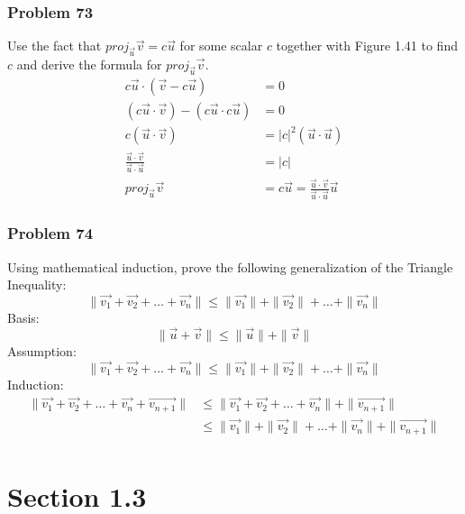 \documentclass[letterpaper, 12pt]{math}
\begin{document}
\subsubsection*{Problem 73}
Use the fact that \( proj_{\vec{u}}\vec{v} = c\vec{u} \) for some scalar \( c \)
together with Figure 1.41 to find \( c \) and derive the formula for
\( proj_{\vec{u}}\vec{v} \).
\begin{align*}
  c\vec{u}\cdot(\vec{v}-c\vec{u}) &= 0 \\
  (c\vec{u}\cdot\vec{v})-(c\vec{u}\cdot c\vec{u}) &= 0 \\
  c(\vec{u}\cdot\vec{v}) &= |c|^2(\vec{u}\cdot\vec{u}) \\
  \frac{\vec{u}\cdot\vec{v}}{\vec{u}\cdot\vec{u}} &= |c| \\
  proj_{\vec{u}}\vec{v} &= c\vec{u} =
    \frac{\vec{u}\cdot\vec{v}}{\vec{u}\cdot\vec{u}}\vec{u}
\end{align*}

\subsubsection*{Problem 74}
Using mathematical induction, prove the following generalization of the
Triangle Inequality:
\[ \|\vec{v_1}+\vec{v_2}+\dots+\vec{v_n}\| \le
  \|\vec{v_1}\|+\|\vec{v_2}\|+\dots+\|\vec{v_n}\| \]
Basis:
\[ \|\vec{u}+\vec{v}\| \le \|\vec{u}\|+\|\vec{v}\| \]
Assumption:
\[ \|\vec{v_1}+\vec{v_2}+\dots+\vec{v_n}\| \le
  \|\vec{v_1}\|+\|\vec{v_2}\|+\dots+\|\vec{v_n}\| \]
Induction:
\begin{align*}
  \|\vec{v_1}+\vec{v_2}+\dots+\vec{v_n}+\vec{v_{n+1}}\| &\le
    \|\vec{v_1}+\vec{v_2}+\dots+\vec{v_n}\|+\|\vec{v_{n+1}}\| \\
  &\le \|\vec{v_1}\|+\|\vec{v_2}\|+\dots+\|\vec{v_n}\|+\|\vec{v_{n+1}}\| \\
\end{align*}

\section*{Section 1.3}
\end{document}

